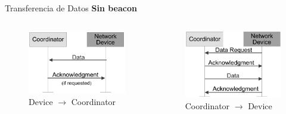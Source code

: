 \documentclass[aspectratio=169]{beamer}
\begin{document}
\begin{frame}[t]{Transferencia de Datos}
\textbf{Sin beacon}
\begin{columns}[t]
	\begin{column}{.5\textwidth}
		\begin{minipage}[t][0.7\textheight][s]{\columnwidth}
			\begin{figure}[H]
				\includegraphics[height=.45\textheight]{./imagenes/dev-coord-sinbeacon.jpg}
				\vfill
				\vspace{10px}
				\caption{Device $\rightarrow$ Coordinator}
			\end{figure}
		\end{minipage}
	\end{column}
	\begin{column}{.5\textwidth}
		\begin{minipage}[t][0.7\textheight][s]{\columnwidth}
			\begin{figure}[H]
				\includegraphics[height=.5\textheight]{./imagenes/coord-dev-sinbeacon.jpg}
				\vfill
				\caption{Coordinator $\rightarrow$ Device}
			\end{figure}	 		
		\end{minipage}
	\end{column}
\end{columns} 	  	
\end{frame}
\end{document}
